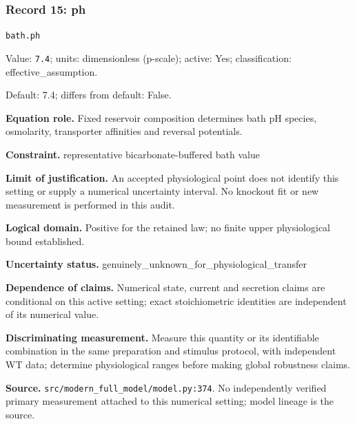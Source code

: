 \subsubsection*{Record 15: ph}
{\small \nolinkurl{bath.ph}\par

Value: \texttt{7.4}; units: dimensionless (p-scale); active: Yes; classification: effective\_assumption.\par

Default: 7.4; differs from default: False.\par

\textbf{Equation role.} Fixed reservoir composition determines bath pH species, osmolarity, transporter affinities and reversal potentials.\par

\textbf{Constraint.} representative bicarbonate-buffered bath value\par

\textbf{Limit of justification.} An accepted physiological point does not identify this setting or supply a numerical uncertainty interval. No knockout fit or new measurement is performed in this audit.\par

\textbf{Logical domain.} Positive for the retained law; no finite upper physiological bound established.\par

\textbf{Uncertainty status.} genuinely\_unknown\_for\_physiological\_transfer\par

\textbf{Dependence of claims.} Numerical state, current and secretion claims are conditional on this active setting; exact stoichiometric identities are independent of its numerical value.\par

\textbf{Discriminating measurement.} Measure this quantity or its identifiable combination in the same preparation and stimulus protocol, with independent WT data; determine physiological ranges before making global robustness claims.\par

\textbf{Source.} \nolinkurl{src/modern_full_model/model.py:374}. No independently verified primary measurement attached to this numerical setting; model lineage is the source.\par}

